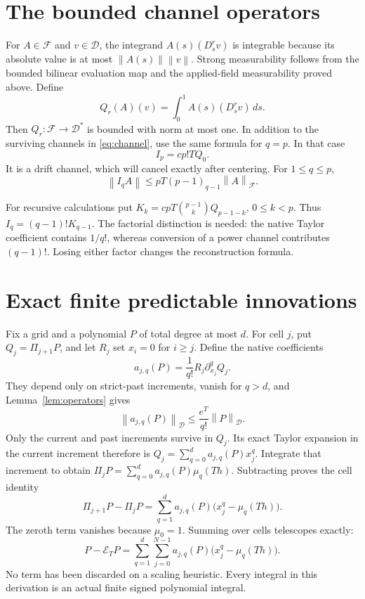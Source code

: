 \documentclass[11pt]{article}
\theoremstyle{remark}\newtheorem{remark}[theorem]{Remark}
\newcommand{\D}{\mathcal D}\newcommand{\E}{\mathcal E}
\newcommand{\norm}[1]{\left\lVert#1\right\rVert}
\begin{document}
\section{The bounded channel operators}
For $A\in\mathcal F$ and $v\in\D$, the integrand
$A(s)(D_s^r v)$ is integrable because its absolute value is at
most $\norm{A(s)}\norm v$. Strong measurability follows from
the bounded bilinear evaluation map and the applied-field
measurability proved above. Define
\[
 Q_r(A)(v)=\int_0^1 A(s)(D_s^r v)\,ds.
\]
Then $Q_r:\mathcal F\to\D^*$ is bounded with norm at most one.
In addition to the surviving channels in \eqref{eq:channel}, use
the same formula for $q=p$. In that case
\begin{equation}\label{eq:driftchannel}
 I_p=cp!T Q_0.
\end{equation}
It is a drift channel, which will cancel exactly after centering.
For $1\leq q\leq p$,
\begin{equation}\label{eq:Ibound}
 \norm{I_q A}\leq pT(p-1)_{q-1}\norm A_{\mathcal F}.
\end{equation}

For recursive calculations put
$K_k=cpT\binom{p-1}{k}Q_{p-1-k}$, $0\leq k<p$.
Thus $I_q=(q-1)!K_{q-1}$.
The factorial distinction is needed: the native Taylor coefficient
contains $1/q!$, whereas conversion of a power channel contributes
$(q-1)!$. Losing either factor changes the reconstruction formula.

\section{Exact finite predictable innovations}
Fix a grid and a polynomial $P$ of total degree at most $d$.
For cell $j$, put $Q_j=\Pi_{j+1}P$, and let $R_j$ set $x_i=0$
for $i\geq j$. Define the native coefficients
\begin{equation}\label{eq:nativejet}
 a_{j,q}(P)=\frac1{q!}R_j\partial_{x_j}^q Q_j.
\end{equation}
They depend only on strict-past increments, vanish for $q>d$,
and Lemma~\ref{lem:operators} gives
\begin{equation}\label{eq:jetbound}
 \norm{a_{j,q}(P)}_{\D}\leq\frac{e^T}{q!}\norm P_{\D}.
\end{equation}
Only the current and past increments survive in $Q_j$.
Its exact Taylor expansion in the current increment therefore is
$Q_j=\sum_{q=0}^d a_{j,q}(P)x_j^q$.
Integrate that increment to obtain
$\Pi_jP=\sum_{q=0}^d a_{j,q}(P)\mu_q(Th)$.
Subtracting proves the cell identity
\begin{equation}\label{eq:cell}
 \Pi_{j+1}P-\Pi_jP
 =\sum_{q=1}^d a_{j,q}(P)\big(x_j^q-\mu_q(Th)\big).
\end{equation}
The zeroth term vanishes because $\mu_0=1$.
Summing over cells telescopes exactly:
\begin{equation}\label{eq:telescope}
 P-\E_TP=\sum_{q=1}^d\sum_{j=0}^{N-1}
 a_{j,q}(P)\big(x_j^q-\mu_q(Th)\big).
\end{equation}
No term has been discarded on a scaling heuristic. Every integral
in this derivation is an actual finite signed polynomial integral.
\end{document}
